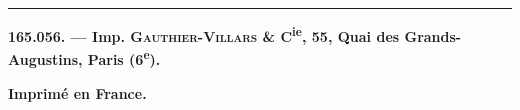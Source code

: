 \noindent\rule{\linewidth}{0.4pt}

\textbf{165.056. --- Imp. \textsc{Gauthier-Villars} \& C\textsuperscript{ie}, 55, Quai des Grands-Augustins, Paris (6\textsuperscript{e}).}

\centerline{\textbf{Imprimé en France.}}
